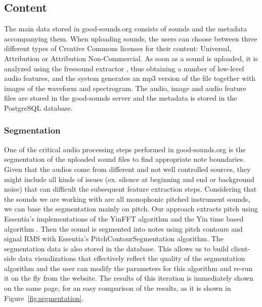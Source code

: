 \documentclass{article}
\begin{document}
\subsection{Content}
The main data stored in good-sounds.org consists of sounds and the metadata accompanying them. When uploading sounds, the users can choose between three different types of Creative Commons licenses for their content: Universal, Attribution or Attribution Non-Commercial. As soon as a sound is uploaded, it is analyzed using the freesound extractor \cite{02}, thus obtaining a number of low-level audio features, and the system generates an mp3 version of the file together with images of the waveform and spectrogram. The audio, image and audio feature files are stored in the good-sounds server and the metadata is stored in the PostgreSQL database. 

\subsubsection{Segmentation}
One of the critical audio processing steps performed in good-sounds.org is the segmentation of the uploaded sound files to find appropriate note boundaries. Given that the audios come from different and not well controlled sources, they might include all kinds of issues (ex. silence at beginning and end or background noise) that can difficult the subsequent feature extraction steps. Considering that the sounds we are working with are all monophonic pitched instrument sounds, we can base the segmentation mainly on pitch. Our approach extracts pitch using Essentia’s \cite{03} implementations of the YinFFT algorithm \cite{07} and the Yin time based algorithm \cite{05}. Then the sound is segmented into notes using pitch contours \cite{06} and signal RMS with Essentia’s PitchContourSegmentation algorithm.  
The segmentation data is also stored in the database. This allows us to build client-side data visualizations that effectively reflect the quality of the segmentation algorithm and the user can modify the parameters for this algorithm and re-run it on the fly from the website. The results of this ite\-ration is immediately shown on the same page, for an easy comparison of the results, as it is shown in Figure~\ref{fig:segmentation}.
\end{document}
